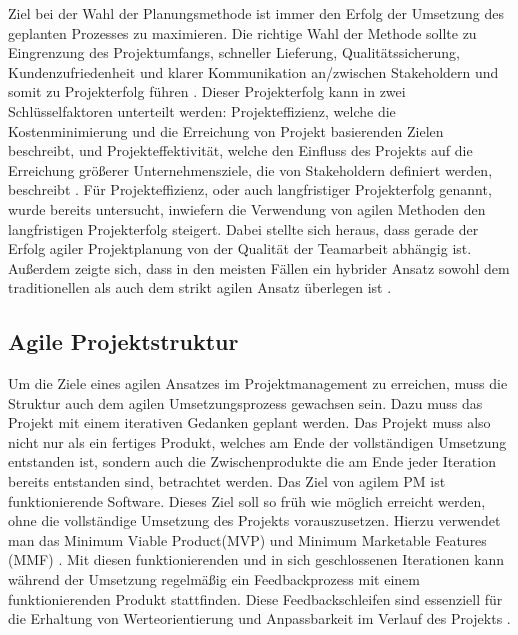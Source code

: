 Ziel bei der Wahl der Planungsmethode ist immer den Erfolg der Umsetzung des geplanten Prozesses zu maximieren.
Die richtige Wahl der Methode sollte zu Eingrenzung des Projektumfangs, schneller Lieferung, Qualitätssicherung, Kundenzufriedenheit und klarer Kommunikation an/zwischen Stakeholdern und somit zu Projekterfolg führen \cite{systemsApproachToPlanningSchedulingAndControlling}.
Dieser Projekterfolg kann in zwei Schlüsselfaktoren unterteilt werden: Projekteffizienz, welche die Kostenminimierung und die Erreichung von Projekt basierenden Zielen beschreibt, und Projekteffektivität, welche den Einfluss des Projekts auf die Erreichung größerer Unternehmensziele, die von Stakeholdern definiert werden, beschreibt \cite{relationshipBetweenProjectSuccessAndProjectEfficiency}.
Für Projekteffizienz, oder auch langfristiger Projekterfolg genannt, wurde bereits untersucht, inwiefern die Verwendung von agilen Methoden den langfristigen Projekterfolg steigert. Dabei stellte sich heraus, dass gerade der Erfolg agiler Projektplanung von der Qualität der Teamarbeit abhängig ist.
Außerdem zeigte sich, dass in den meisten Fällen ein hybrider Ansatz sowohl dem traditionellen als auch dem strikt agilen Ansatz überlegen ist \cite{traditionalAndAgileOnProjectSuccess}.

\subsection{Agile Projektstruktur}
Um die Ziele eines agilen Ansatzes im Projektmanagement zu erreichen, muss die Struktur auch dem agilen Umsetzungsprozess gewachsen sein. Dazu muss das Projekt mit einem iterativen Gedanken geplant werden. Das Projekt muss also nicht nur als ein fertiges Produkt, welches am Ende der vollständigen Umsetzung entstanden ist, sondern auch die Zwischenprodukte die am Ende jeder Iteration bereits entstanden sind, betrachtet werden. Das Ziel von agilem PM ist funktionierende Software. Dieses Ziel soll so früh wie möglich erreicht werden, ohne die vollständige Umsetzung des Projekts vorauszusetzen. Hierzu verwendet man das Minimum Viable Product(MVP) und Minimum Marketable Features (MMF) \cite{agilesProjektmanagementImBerufsalltagMVPundMMF}.  Mit diesen funktionierenden und in sich geschlossenen Iterationen kann während der Umsetzung regelmäßig ein Feedbackprozess mit einem funktionierenden Produkt stattfinden. Diese Feedbackschleifen sind essenziell für die Erhaltung von Werteorientierung und Anpassbarkeit im Verlauf des Projekts \cite{AMORIM2021101496}.

